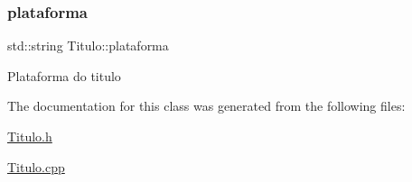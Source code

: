 \subsubsection{\texorpdfstring{plataforma}{plataforma}}
{\footnotesize\ttfamily std\+::string Titulo\+::plataforma\hspace{0.3cm}{\ttfamily [protected]}}

Plataforma do titulo 

The documentation for this class was generated from the following files\+:\begin{DoxyCompactItemize}
\item 
\mbox{\hyperlink{_titulo_8h}{Titulo.\+h}}\item 
\mbox{\hyperlink{_titulo_8cpp}{Titulo.\+cpp}}\end{DoxyCompactItemize}
